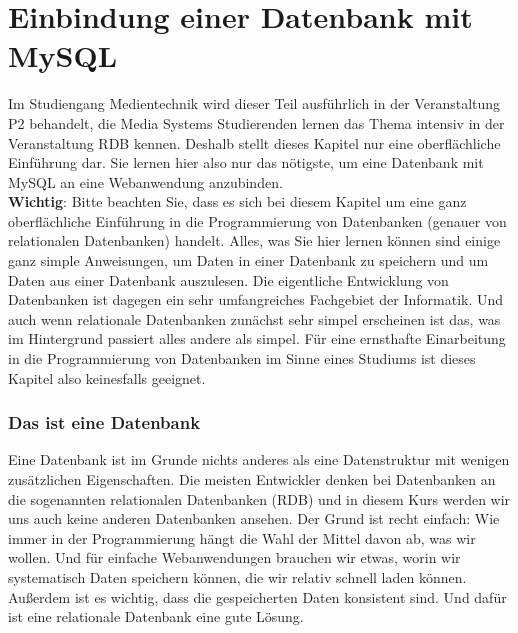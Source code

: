 \chapter{Einbindung einer Datenbank mit MySQL}

Im Studiengang Medientechnik wird dieser Teil ausführlich in der Veranstaltung P2 behandelt, die Media Systems Studierenden lernen das Thema intensiv in der Veranstaltung RDB kennen. Deshalb stellt dieses Kapitel nur eine oberflächliche Einführung dar. Sie lernen hier also nur das nötigste, um eine Datenbank mit MySQL an eine Webanwendung anzubinden.\\

\textbf{Wichtig}: Bitte beachten Sie, dass es sich bei diesem Kapitel um eine ganz oberflächliche Einführung in die Programmierung von Datenbanken (genauer von relationalen Datenbanken) handelt. Alles, was Sie hier lernen können sind einige ganz simple Anweisungen, um Daten in einer Datenbank zu speichern und um Daten aus einer Datenbank auszulesen. Die eigentliche Entwicklung von Datenbanken ist dagegen ein sehr umfangreiches Fachgebiet der Informatik. Und auch wenn relationale Datenbanken zunächst sehr simpel erscheinen ist das, was im Hintergrund passiert alles andere als simpel. Für eine ernsthafte Einarbeitung in die Programmierung von Datenbanken im Sinne eines Studiums ist dieses Kapitel also keinesfalls geeignet.

\subsection{Das ist eine Datenbank}

Eine Datenbank ist im Grunde nichts anderes als eine Datenstruktur mit wenigen zusätzlichen Eigenschaften. Die meisten Entwickler denken bei Datenbanken an die sogenannten relationalen Datenbanken (RDB) und in diesem Kurs werden wir uns auch keine anderen Datenbanken ansehen. Der Grund ist recht einfach: Wie immer in der Programmierung hängt die Wahl der Mittel davon ab, was wir wollen. Und für einfache Webanwendungen brauchen wir etwas, worin wir systematisch Daten speichern können, die wir relativ schnell laden können. Außerdem ist es wichtig, dass die gespeicherten Daten konsistent sind. Und dafür ist eine relationale Datenbank eine gute Lösung.\\

